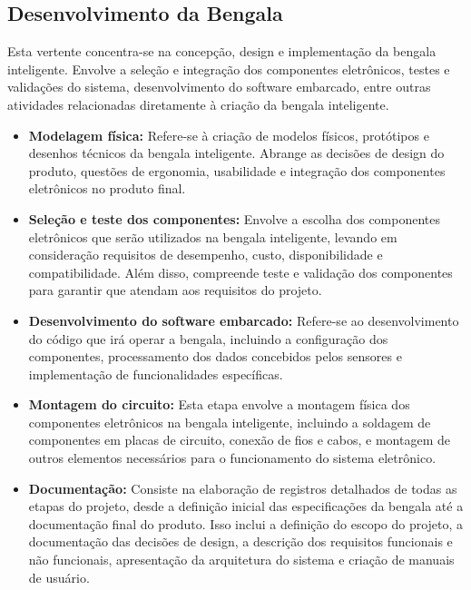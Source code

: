     \subsection{Desenvolvimento da Bengala}
    Esta vertente concentra-se na concepção, design e implementação da bengala inteligente. Envolve a seleção e integração dos componentes eletrônicos, testes e validações do sistema, desenvolvimento do software embarcado,  entre outras atividades relacionadas diretamente à criação da bengala inteligente.


    \begin{itemize}
        \item \textbf{Modelagem física:} Refere-se à criação de modelos físicos, protótipos e desenhos técnicos da bengala inteligente. Abrange as decisões de design do produto, questões de ergonomia, usabilidade e integração dos componentes eletrônicos no produto final.
        
        \item \textbf{Seleção e teste dos componentes:} Envolve a escolha dos componentes eletrônicos que serão utilizados na bengala inteligente, levando em consideração requisitos de desempenho, custo, disponibilidade e compatibilidade. Além disso, compreende teste e validação dos componentes para garantir que atendam aos requisitos do projeto.
        
        \item \textbf{Desenvolvimento do software embarcado:} Refere-se ao desenvolvimento do código que irá operar a bengala, incluindo a configuração dos componentes, processamento dos dados concebidos pelos sensores e implementação de funcionalidades específicas.
        
        \item \textbf{Montagem do circuito:} Esta etapa envolve a montagem física dos componentes eletrônicos na bengala inteligente, incluindo a soldagem de componentes em placas de circuito, conexão de fios e cabos, e montagem de outros elementos necessários para o funcionamento do sistema eletrônico.
        
        \item \textbf{Documentação:} Consiste na elaboração de registros detalhados de todas as etapas do projeto, desde a definição inicial das especificações da bengala até a documentação final do produto. Isso inclui a definição do escopo do projeto, a documentação das decisões de design, a descrição dos requisitos funcionais e não funcionais, apresentação da arquitetura do sistema e criação de manuais de usuário.
    \end{itemize}

